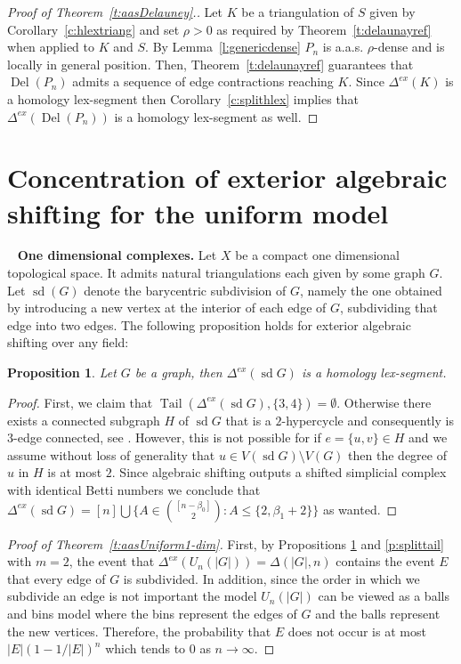 \documentclass[reqno,english]{amsart}
\newtheorem{proposition}[theorem]{Proposition}
\numberwithin{claimcounter}{theorem}
\theoremstyle{remark}
\theoremstyle{definition}
\numberwithin{theorem}{section}
\DeclareMathOperator{\sd}{sd}
\DeclareMathOperator{\tail}{Tail}
\DeclareMathOperator{\Del}{Del}
\newcommand{\exshift}[1]{\Delta^{ex}(#1)}
\begin{document}
\begin{proof}[Proof of Theorem~\ref{t:aasDelauney}.]
  Let $K$ be a triangulation of $S$ given by Corollary~\ref{c:hlextriang} and set $\rho > 0$ as required by Theorem~\ref{t:delaunayref} when applied to $K$ and $S$.
  By Lemma~\ref{l:genericdense} $P_n$ is a.a.s. $\rho$-dense and is locally in general position. Then, Theorem~\ref{t:delaunayref} guarantees that $\Del(P_n)$ admits a sequence of edge contractions reaching $K$. Since $\exshift{K}$ is a homology lex-segment then Corollary~\ref{c:splithlex} implies that $\exshift{\Del(P_n)}$ is a homology lex-segment as well.
\end{proof}



\section{Concentration of exterior algebraic shifting for the uniform model}~\label{sec:ass1dim}
\noindent
{\bf One dimensional complexes.}
Let $X$ be a compact one dimensional topological space.
It admits natural triangulations each given by some graph $G$. Let $\sd(G)$ denote the barycentric subdivision of $G$, namely the one obtained by introducing a new vertex at the interior of each edge of $G$, subdividing that edge into two edges.
The following proposition holds for exterior algebraic shifting over any field:
\begin{proposition}
    \label{p:graphsdlex}
    Let $G$ be a graph, then $\exshift{\sd G}$ is a homology lex-segment.
\end{proposition}
\begin{proof}
    First, we claim that $\tail(\exshift{\sd G},\{3,4\}) = \emptyset$. Otherwise there exists a connected subgraph $H$ of $\sd G$ that is a $2$-hypercycle and consequently is $3$-edge connected, see \cite[Theorem 5.4]{kalai85-hyperconnectivity}. However, this is not possible for if $e=\{u,v\}\in H$ and we assume without loss of generality that $u \in V(\sd G)\setminus V(G)$ then the degree of $u$ in $H$ is at most $2$.
    Since algebraic shifting outputs a shifted simplicial complex with identical Betti numbers we conclude that $\exshift{\sd G} = [n]\bigcup \{A\in \binom{[n-\beta_0]}{2}\colon A \leq \{2,\beta_1+2\}\}$ as wanted.
    \end{proof}

\begin{proof}[Proof of Theorem~\ref{t:aasUniform1-dim}]
    First, by Propositions \ref{p:graphsdlex} and \ref{p:splittail} with $m=2$, the event that $\exshift{U_n(|G|)}=\Delta(|G|,n)$ contains the event $E$  that every edge of $G$ is subdivided. 
    In addition, since the order in which we subdivide an edge is not important the model $U_n(|G|)$ can be viewed as a balls and bins model where the bins represent the edges of $G$ and the balls represent the new vertices. Therefore, the probability that $E$ does not occur is at most $|E|(1-1/|E|)^n$ which tends to $0$ as $n\to\infty.$
\end{proof}
\end{document}
